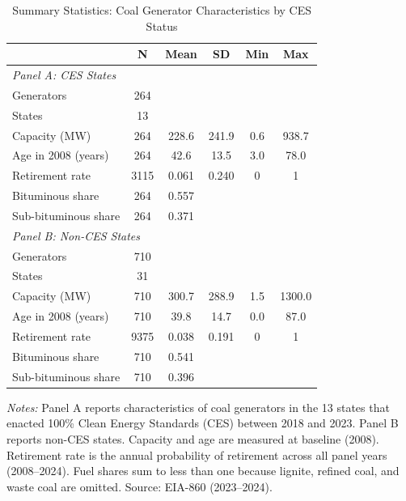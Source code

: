 \begin{table}[t]
\centering
\caption{Summary Statistics: Coal Generator Characteristics by CES Status}
\label{tab:summary}
\begin{tabular}{lccccc}
\toprule
 & N & Mean & SD & Min & Max \\
\midrule
\multicolumn{6}{l}{\textit{Panel A: CES States}} \\[3pt]
Generators & 264 & & & & \\
States & 13 & & & & \\
Capacity (MW) & 264 & 228.6 & 241.9 & 0.6 & 938.7 \\
Age in 2008 (years) & 264 & 42.6 & 13.5 & 3.0 & 78.0 \\
Retirement rate & 3115 & 0.061 & 0.240 & 0 & 1 \\
Bituminous share & 264 & 0.557 & & & \\
Sub-bituminous share & 264 & 0.371 & & & \\
[6pt]
\multicolumn{6}{l}{\textit{Panel B: Non-CES States}} \\[3pt]
Generators & 710 & & & & \\
States & 31 & & & & \\
Capacity (MW) & 710 & 300.7 & 288.9 & 1.5 & 1300.0 \\
Age in 2008 (years) & 710 & 39.8 & 14.7 & 0.0 & 87.0 \\
Retirement rate & 9375 & 0.038 & 0.191 & 0 & 1 \\
Bituminous share & 710 & 0.541 & & & \\
Sub-bituminous share & 710 & 0.396 & & & \\
\bottomrule
\end{tabular}
\begin{minipage}{0.92\textwidth}
\vspace{4pt}
\footnotesize
\textit{Notes:} Panel A reports characteristics of coal generators in the 13 states
that enacted 100\% Clean Energy Standards (CES) between 2018 and 2023.
Panel B reports non-CES states. Capacity and age are measured at baseline (2008).
Retirement rate is the annual probability of retirement across all panel years (2008--2024).
Fuel shares sum to less than one because lignite, refined coal, and waste coal are omitted.
Source: EIA-860 (2023--2024).
\end{minipage}
\end{table}
